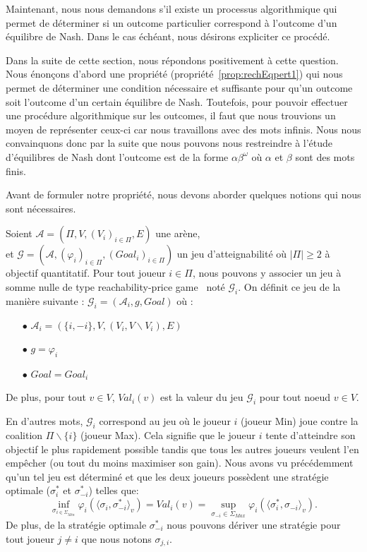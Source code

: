 Maintenant, nous nous demandons s'il existe un processus algorithmique qui permet de déterminer si un outcome particulier correspond à l'outcome d'un équilibre de Nash. Dans le cas échéant, nous désirons expliciter ce procédé.

Dans la suite de cette section, nous répondons positivement à cette question. Nous énonçons d'abord une propriété (propriété~\ref{prop:rechEqpert1}) qui nous permet de déterminer une condition nécessaire et suffisante pour qu'un outcome soit l'outcome d'un certain équilibre de Nash. Toutefois, pour pouvoir effectuer une procédure algorithmique sur les outcomes, il faut que nous trouvions un moyen de représenter ceux-ci car nous travaillons avec des mots infinis. Nous nous convainquons donc par la suite que nous pouvons nous restreindre à l'étude d'équilibres de Nash dont l'outcome est de la forme $\alpha \beta^{\omega}$ où $\alpha$ et $\beta$ sont des mots finis. 

Avant de formuler notre propriété, nous devons aborder quelques notions qui nous sont nécessaires.


\begin{defi}
	\label{defi:coalGame}
 Soient $\mathcal{A} = (\Pi, V, (V_{i})_{i\in\Pi}, E)$ une arène,\\
et $\mathcal{G} = (\mathcal{A}, (\varphi _{i})_{i\in\Pi}, (Goal_{i})_{i\in\Pi})$ un jeu d'atteignabilité où $|\Pi| \geq 2$ à objectif quantitatif.
Pour tout joueur $i \in \Pi$, nous pouvons y associer un jeu à somme nulle de type \og reachability-price game \fg~noté $\mathcal{G}_{i}$.
On définit ce jeu de la manière suivante : 
$ \displaystyle \mathcal{G}_{i}= (\mathcal{A}_{i}, g , Goal) \text{ où }$:
\begin{itemize}
	\item[$\bullet$] $\mathcal{A}_{i} = (\{i,-i \}, V, (V_{i},V\backslash V_i),E)$
	\item[$\bullet$] $g = \varphi_i$ 
	\item[$\bullet$] $Goal = Goal_i$
\end{itemize}

\noindent De plus, pour tout $v\in V$, $Val_i(v)$ est la valeur du jeu $\mathcal{G}_i$ pour tout noeud $v\in V$. 
\end{defi} 

En d'autres mots, $\mathcal{G}_i$ correspond au jeu où le joueur $i$ (joueur Min) joue contre la coalition $\Pi\backslash\{ i \}$ (joueur Max). Cela signifie que le joueur $i$ tente d'atteindre son objectif le plus rapidement possible tandis que tous les autres joueurs veulent l'en empêcher (ou tout du moins maximiser son gain). Nous avons vu précédemment qu'un tel jeu est déterminé et que les deux joueurs possèdent une stratégie optimale ($\sigma^*_i$ et $\sigma^*_{-i}$) telles que:
$$ \inf_{\sigma _{i\in \Sigma _{Min}}} \varphi_i(\langle \sigma_i,\sigma^*_{-i}\rangle_v)= Val_i(v) = \sup _{\sigma_{-i}\in \Sigma_{Max}} \varphi_i(\langle \sigma^*_i, \sigma_{-i}\rangle_v).$$ De plus, de la stratégie optimale $\sigma^*_{-i}$ nous pouvons dériver une stratégie pour tout joueur $j \neq i$ que nous notons $\sigma_{j,i}$.\\

